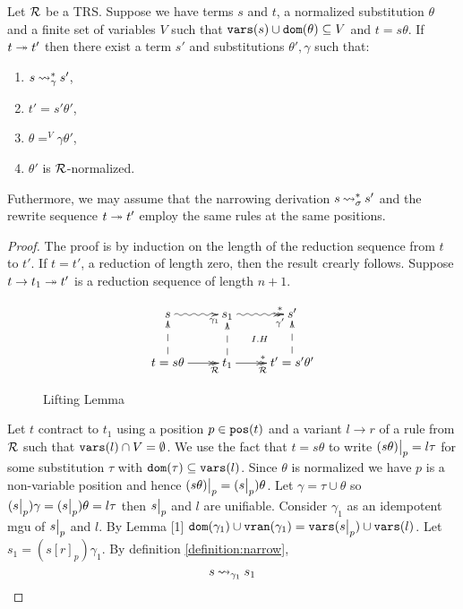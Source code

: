 \begin{lemma}\label{lemma:lifting-lemma-ordinary-narrowing}
	Let $\mathcal{R}$ be a TRS. Suppose we have terms $s$ and $t$, a normalized substitution $\theta$ and a finite set of variables $V$ such that $\mathtt{vars}(s) \cup \mathtt{dom}(\theta) \subseteq V$ and $t = s\theta$. If $t \twoheadrightarrow t'$ then there exist a term $s'$ and substitutions $\theta', \gamma$ such that:
	\begin{enumerate}
		\item $s \mathbin{\rightsquigarrow}^{*}_{\gamma} s'$,
		\item $t' = s'\theta'$,
		\item $\theta =^V \gamma\theta'$,
		\item $\theta'$ is $\mathcal{R}$-normalized.
	\end{enumerate}
	Futhermore, we may assume that the narrowing derivation $s \mathbin{\rightsquigarrow}^{*}_{\sigma} s'$ and the rewrite sequence $t \twoheadrightarrow t'$ employ the same rules at the same positions.

	\begin{proof}
		The proof is by induction on the length of the reduction sequence from $t$ to $t'$. If $t = t'$, a reduction of length zero, then the result crearly follows. Suppose $t \rightarrow t_1 \twoheadrightarrow t'$ is a reduction sequence of length $n+1$.

		\begin{figure}[h!]
			\begin{displaymath}
				\xymatrix{
                    s \ar@{~>}[r]_>>{\gamma_1} & s_1 \ar@{}[dr]|{I.H} \ar@{~>>}[r]_>>{\gamma'}^>>{*} & s' \\
                    t = s\theta \ar@{-->}[u] \ar@{->>}[r]_>>{\trs} & \ar@{-->}[u] t_1 \ar@{->>}[r]_>>{\trs}^>>{*} & t' = s'\theta' \ar@{-->}[u]
				}
			\end{displaymath}
			\caption{Lifting Lemma}
			\label{figure:lifting-lemma}
        \end{figure}

		Let $t$ contract to $t_1$ using a position $p \in \mathtt{pos}(t)$ and a variant $l \rightarrow r$ of a rule from $\mathcal{R}$ such that $\mathtt{vars}(l) \cap V = \emptyset$. We use the fact that $t = s\theta$ to write $\restr{(s\theta)}{p} = l \tau$ for some substitution $\tau$ with $\mathtt{dom}(\tau) \subseteq \mathtt{vars}(l)$. Since $\theta$ is normalized we have $p$ is a non-variable position and hence $\restr{(s\theta)}{p} = (\restr{s}{p})\theta$. Let $\gamma = \tau \cup \theta$ so $(\restr{s}{p})\gamma = (\restr{s}{p})\theta = l \tau$ then $\restr{s}{p}$ and $l$ are unifiable. Consider $\gamma_1$ as an idempotent mgu of $\restr{s}{p}$ and $l$. By Lemma [1] $\dom{\gamma_1} \cup \vran{\gamma_1} = \vars{\restr{s}{p}} \cup \vars{l}$. Let $s_1 = (s[r]_p)\gamma_1$. By definition \ref{definition:narrow},
		\begin{equation}\label{lifting-lemma:eqn:s-narrows-s_1}
			s \mathbin{\rightsquigarrow}_{\gamma_1} s_1
		\end{equation}


\end{proof}
\end{lemma}
